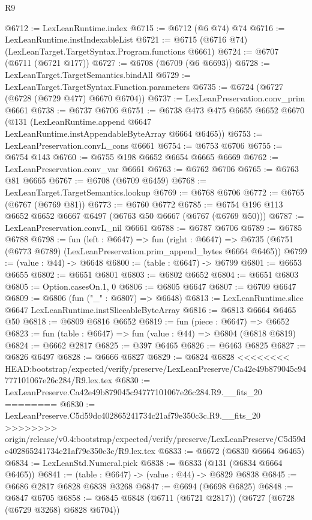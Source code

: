 \begin{lexlean}{R9}
\begin{coremodule}
{{{{{{{{{{{{{{{{{{{{{{{{{{{{{{{{{{{{{{{{{{{{{{{{{{{{{{{{{{{{{{{{{{{{{{{{{{{{{{{{{{{{@6712 := LexLeanRuntime.index
@6715 := @6712 (@6 @74) @74
@6716 := LexLeanRuntime.instIndexableList
@6721 := @6715 (@6716 @74) (LexLeanTarget.TargetSyntax.Program.functions @6661)
@6724 := @6707 (@6711 (@6721 @177))
@6727 := @6708 (@6709 (@6 @6693))
@6728 := LexLeanTarget.TargetSemantics.bindAll
@6729 := LexLeanTarget.TargetSyntax.Function.parameters
@6735 := @6724 (@6727 (@6728 (@6729 @477) @6670 @6704))
@6737 := LexLeanPreservation.conv_prim @6661
@6738 := @6737 @6706
@6751 := @6738
    @473
    @475
    @6655
    @6652
    @6670
    (@131 (LexLeanRuntime.append @6647 LexLeanRuntime.instAppendableByteArray @6664 @6465))
@6753 := LexLeanPreservation.convL_cons @6661
@6754 := @6753 @6706
@6755 := @6754 @143
@6760 := @6755 @198 @6652 @6654 @6665 @6669
@6762 := LexLeanPreservation.conv_var @6661
@6763 := @6762 @6706
@6765 := @6763 @81 @6665
@6767 := @6708 (@6709 @6459)
@6768 := LexLeanTarget.TargetSemantics.lookup
@6769 := @6768 @6706
@6772 := @6765 (@6767 (@6769 @81))
@6773 := @6760 @6772
@6785 := @6754 @196 @113 @6652 @6652 @6667 @6497 (@6763 @50 @6667 (@6767 (@6769 @50)))
@6787 := LexLeanPreservation.convL_nil @6661
@6788 := @6787 @6706
@6789 := @6785 @6788
@6798 := fun (left : @6647) =>
  fun (right : @6647) =>
  @6735 (@6751 (@6773 @6789) (LexLeanPreservation.prim_append_bytes @6664 @6465))
@6799 := (value : @44) -> @6648
@6800 := (table : @6647) -> @6799
@6801 := @6653 @6655
@6802 := @6651 @6801
@6803 := @6802 @6652
@6804 := @6651 @6803
@6805 := Option.casesOn.{1, 0}
@6806 := @6805 @6647
@6807 := @6709 @6647
@6809 := @6806 (fun ("_" : @6807) => @6648)
@6813 := LexLeanRuntime.slice @6647 LexLeanRuntime.instSliceableByteArray
@6816 := @6813 @6664 @6465 @50
@6818 := @6809 @6816 @6652
@6819 := fun (piece : @6647) => @6652
@6823 := fun (table : @6647) => fun (value : @44) => @6804 (@6818 @6819)
@6824 := @6662 @2817
@6825 := @397 @6465
@6826 := @6463 @6825
@6827 := @6826 @6497
@6828 := @6666 @6827
@6829 := @6824 @6828
<<<<<<<< HEAD:bootstrap/expected/verify/preserve/LexLeanPreserve/Ca42e49b879045c94777101067e26c284/R9.lex.tex
@6830 := LexLeanPreserve.Ca42e49b879045c94777101067e26c284.R9.__fits_20
========
@6830 := LexLeanPreserve.C5d59dc402865241734c21af79e350c3c.R9.__fits_20
>>>>>>>> origin/release/v0.4:bootstrap/expected/verify/preserve/LexLeanPreserve/C5d59dc402865241734c21af79e350c3c/R9.lex.tex
@6833 := @6672 (@6830 @6664 @6465)
@6834 := LexLeanStd.Numeral.pick
@6838 := @6833 (@131 (@6834 @6664 @6465))
@6841 := (table : @6647) -> (value : @44) -> @6829 @6838
@6845 := @6686 @2817 @6828 @6838 @3268
@6847 := @6694 (@6698 @6825)
@6848 := @6847 @6705
@6858 := @6845 @6848 (@6711 (@6721 @2817)) (@6727 (@6728 (@6729 @3268) @6828 @6704))
}}}}}}}}}}}}}}}}}}}}}}}}}}}}}}}}}}}}}}}}}}}}}}}}}}}}}}}}}}}}}}}}}}}}}}}}}}}}}}}}}}}}
\end{coremodule}
\end{lexlean}
